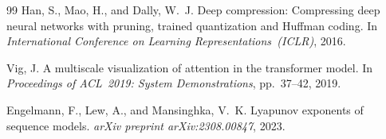 \documentclass{article}
\begin{document}
\begin{thebibliography}{99}
Han, S., Mao, H., and Dally, W.~J.
\newblock Deep compression: Compressing deep neural networks with pruning,
  trained quantization and Huffman coding.
\newblock In \emph{International Conference on Learning Representations~(ICLR)}, 2016.

Vig, J.
\newblock A multiscale visualization of attention in the transformer model.
\newblock In \emph{Proceedings of ACL~2019: System Demonstrations}, pp.~37--42, 2019.

Engelmann, F., Lew, A., and Mansinghka, V.~K.
\newblock Lyapunov exponents of sequence models.
\newblock \emph{arXiv preprint arXiv:2308.00847}, 2023.

\end{thebibliography}
\end{document}
